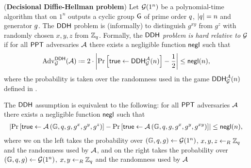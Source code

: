 \begin{defn}
(\textbf{Decisional Diffie-Hellman problem}) Let $\operatorname{\mathcal{G}}(1^n)$ be a polynomial-time algorithm that on $1^n$ outputs a cyclic group $\operatorname{\mathsf{G}}$ of prime order $q$, $\vert q\vert = n$ and generator $g$. The $\mathsf{DDH}$ problem is (informally) to distinguish $g^{xy}$ from $g^z$ with randomly chosen $x,y,z$ from $\mathbb{Z}_q$. Formally, the \textit{$\mathsf{DDH}$ problem is hard relative to} $\operatorname{\mathcal{G}}$ if for all $\mathsf{PPT}$ adversaries $\mathcal{A}$ there exists a negligible function $\operatorname{\mathsf{negl}}$ such that 
\begin{align*}
	\adv_{\groupgen}^{\DDH}(\adve)\defeq 2\cdot\left\vert \prob{\true\leftarrow \DDH_{\groupgen}^{\adve}(n)} - \frac{1}{2} \right\vert \leq \negl(n),
\end{align*}
where the probability is taken over the randomness used in the game $\mathsf{DDH}_{\operatorname{\mathcal{G}}}^{\mathcal{A}}(n)$ defined in .
\end{defn}
The $\mathsf{DDH}$ assumption is equivalent to the following: for all $\mathsf{PPT}$ adversaries $\mathcal{A}$ there exists a negligible function $\operatorname{\mathsf{negl}}$ such that
\begin{align*}
	\left\vert\operatorname{Pr}\left[{\mathsf{true}\leftarrow \mathcal{A}\left(\mathbb{G},q,g,g^x,g^y,g^z\right)}\right] - \operatorname{Pr}\left[{\mathsf{true}\leftarrow\mathcal{A}\left(\mathbb{G},q,g,g^x,g^y,g^{xy}\right)}\right]\right\vert\leq \operatorname{\mathsf{negl}}(n),
\end{align*}
where we on the left takes the probability over $(\mathbb{G},q,g)\leftarrow\operatorname{\mathcal{G}}(1^n)$, $x,y,z\leftarrow_R\mathbb{Z}_q$ and the randomness used by $\mathcal{A}$, and  on the right takes the probability over $(\mathbb{G},q,g)\leftarrow\operatorname{\mathcal{G}}(1^n)$, $x,y\leftarrow_R\mathbb{Z}_q$ and the randomness used by $\mathcal{A}$ 

